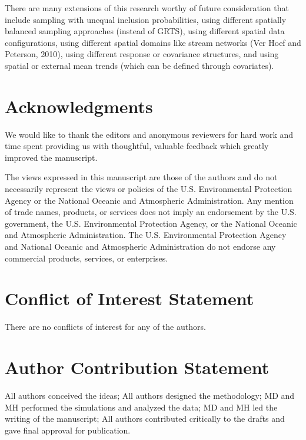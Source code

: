 \documentclass[]{elsarticle} %
\begin{document}
There are many extensions of this research worthy of future
consideration that include sampling with unequal inclusion
probabilities, using different spatially balanced sampling approaches
(instead of GRTS), using different spatial data configurations, using
different spatial domains like stream networks (Ver Hoef and Peterson,
2010), using different response or covariance structures, and using
spatial or external mean trends (which can be defined through
covariates).

\hypertarget{acknowledgments}{%
\section*{Acknowledgments}\label{acknowledgments}}

We would like to thank the editors and anonymous reviewers for hard work
and time spent providing us with thoughtful, valuable feedback which
greatly improved the manuscript.

The views expressed in this manuscript are those of the authors and do
not necessarily represent the views or policies of the U.S.
Environmental Protection Agency or the National Oceanic and Atmospheric
Administration. Any mention of trade names, products, or services does
not imply an endorsement by the U.S. government, the U.S. Environmental
Protection Agency, or the National Oceanic and Atmospheric
Administration. The U.S. Environmental Protection Agency and National
Oceanic and Atmospheric Administration do not endorse any commercial
products, services, or enterprises.

\hypertarget{conflict-of-interest-statement}{%
\section*{Conflict of Interest
Statement}\label{conflict-of-interest-statement}}

There are no conflicts of interest for any of the authors.

\hypertarget{author-contribution-statement}{%
\section*{Author Contribution
Statement}\label{author-contribution-statement}}

All authors conceived the ideas; All authors designed the methodology;
MD and MH performed the simulations and analyzed the data; MD and MH led
the writing of the manuscript; All authors contributed critically to the
drafts and gave final approval for publication.
\end{document}
